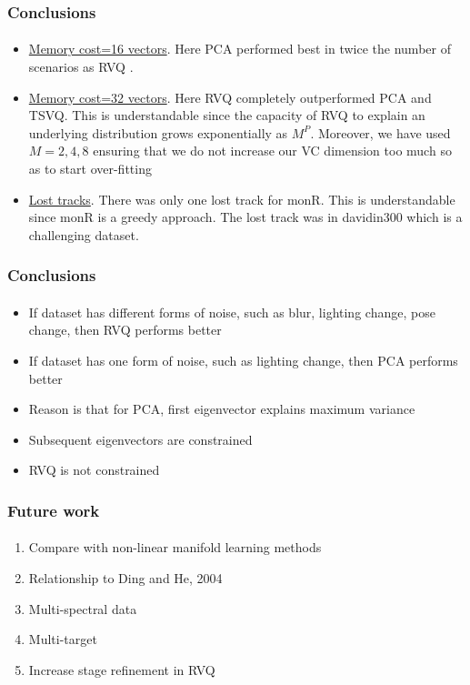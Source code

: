 \begin{frame}
\frametitle{Conclusions}
\framesubtitle{}
\logoCSIPCPL\mypagenum
\begin{itemize}
\item \underline{Memory cost=16 vectors}.  Here PCA performed best in twice the number of scenarios as RVQ .
\item \underline{Memory cost=32 vectors}.  Here RVQ completely outperformed PCA and TSVQ.  This is understandable since the capacity of RVQ to explain an underlying distribution grows exponentially as $M^P$.  Moreover, we have used $M=2, 4, 8$ ensuring that we do not increase our VC dimension too much so as to start over-fitting
\item \underline{Lost tracks}.  There was only one lost track for monR.  This is understandable since monR is a greedy approach.  The lost track was in davidin300 which is a challenging dataset.
\end{itemize}
\end{frame}

\begin{frame}
\frametitle{Conclusions}
\framesubtitle{}
\logoCSIPCPL\mypagenum
\begin{itemize}
\item If dataset has different forms of noise, such as blur, lighting change, pose change, then RVQ performs better
\item If dataset has one form of noise, such as lighting change, then PCA performs better
\item Reason is that for PCA, first eigenvector explains maximum variance
\item Subsequent eigenvectors are constrained
\item RVQ is not constrained
\end{itemize}
\end{frame}


\begin{frame}
\frametitle{Future work}
\framesubtitle{}
\logoCSIPCPL\mypagenum
\setcounter{subfigure}{0}
\begin{enumerate}
\item Compare with non-linear manifold learning methods
\item Relationship to Ding and He, 2004
\item Multi-spectral data
\item Multi-target
\item Increase stage refinement in RVQ
\end{enumerate}
\end{frame}


